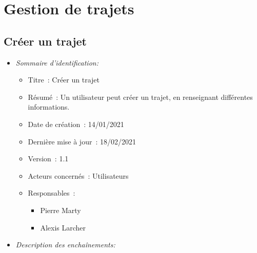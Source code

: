 \section{Gestion de trajets}

\subsection{Créer un trajet}\label{subsec:creer-un-trajet}

\begin{itemize}

\item \textit{Sommaire d'identification:}

\begin{itemize}

\item Titre~: Créer un trajet

\item Résumé~: Un utilisateur peut créer un trajet, en renseignant différentes informations.

\item Date de création~: 14/01/2021

\item Dernière mise à jour~: 18/02/2021

\item Version~: 1.1

\item Acteurs concernés~: Utilisateurs

\item Responsables~:
\begin{itemize}
            \item Pierre Marty
            \item Alexis Larcher
        \end{itemize}

\end{itemize}

\item \textit{Description des enchaînements:}


\end{itemize}
